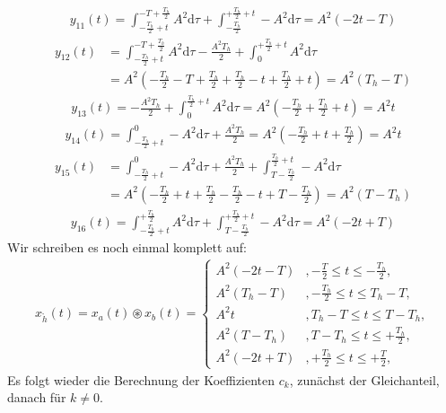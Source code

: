 \documentclass[11pt,a4paper,DIV=12]{scrartcl}
\newcommand{\diff}{\mathrm{d}}
\begin{document}
\begin{align}
	y_{11}(t)=\int_{-\frac{T_h}{2}+t}^{-T+\frac{T_h}{2}}A^2\diff \tau+\int_{-\frac{T_h}{2}}^{+\frac{T_h}{2}+t}-A^2\diff \tau=A^2(-2t-T)
\end{align}
\begin{align}
	y_{12}(t)&=\int_{-\frac{T_h}{2}+t}^{-T+\frac{T_h}{2}}A^2\diff \tau-\frac{A^2T_h}{2}+\int_0^{+\frac{T_h}{2}+t}A^2\diff \tau\nonumber \\
	&=A^2(-\frac{T_h}{2}-T+\frac{T_h}{2}+\frac{T_h}{2}-t+\frac{T_h}{2}+t)=A^2(T_h-T)
\end{align}
\begin{align}
	y_{13}(t)=-\frac{A^2T_h}{2}+\int_0^{\frac{T_h}{2}+t}A^2\diff \tau=A^2(-\frac{T_h}{2}+\frac{T_h}{2}+t)=A^2t
\end{align}
\begin{align}
	y_{14}(t)=\int_{-\frac{T_h}{2}+t}^{0}-A^2\diff \tau+\frac{A^2T_h}{2}=A^2(-\frac{T_h}{2}+t+\frac{T_h}{2})=A^2t
\end{align}
\begin{align}
	y_{15}(t)&=\int_{-\frac{T_h}{2}+t}^0-A^2\diff \tau+\frac{A^2T_h}{2}+\int_{T-\frac{T_h}{2}}^{\frac{T_h}{2}+t}-A^2\diff \tau\nonumber \\
	&=A^2(-\frac{T_h}{2}+t+\frac{T_h}{2}-\frac{T_h}{2}-t+T-\frac{T_h}{2})=A^2(T-T_h)
\end{align}
\begin{align}
	y_{16}(t)=\int_{-\frac{T_h}{2}+t}^{+\frac{T_h}{2}}A^2\diff \tau+\int_{T-\frac{T_h}{2}}^{+\frac{T_h}{2}+t}-A^2\diff \tau=A^2(-2t+T)
\end{align}
Wir schreiben es noch einmal komplett auf:
\begin{align}
	x_{\mathring{h}}(t)=x_{a}(t)\circledast x_{b}(t)=\begin{cases}
		A^2(-2t-T)&,-\frac{T}{2}\leq t \leq -\frac{T_h}{2}, \\
		A^2(T_h-T)&,-\frac{T_h}{2}\leq t \leq T_h-T, \\
		A^2t &,T_h-T\leq t \leq T-T_h, \\
		A^2(T-T_h)&,T-T_h\leq t \leq +\frac{T_h}{2}, \\
		A^2(-2t+T)&,+\frac{T_h}{2}\leq t \leq +\frac{T}{2},
	\end{cases}
\end{align}
Es folgt wieder die Berechnung der Koeffizienten $c_k$, zunächst der Gleichanteil, danach für $k\neq 0$.
\end{document}

